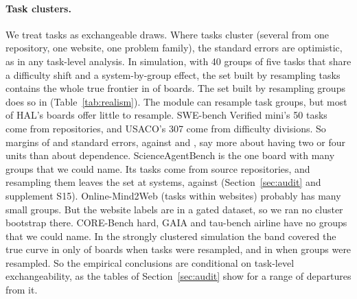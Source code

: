 \documentclass[11pt]{article}
\begin{document}
\paragraph{Task clusters.}
We treat tasks as exchangeable draws. Where tasks cluster (several from one repository, one website, one problem family), the standard errors are optimistic, as in any task-level analysis. In simulation, with 40 groups of five tasks that share a difficulty shift and a system-by-group effect, the set built by resampling tasks contains the whole true frontier in \NumValScClusteredTasksJoint{} of boards. The set built by resampling groups does so in \NumValScClusteredTasksClusterJoint{} (Table~\ref{tab:realism}). The module can resample task groups, but most of HAL's boards offer little to resample. SWE-bench Verified mini's 50 tasks come from \NumClusterSwebenchGroups{} repositories, and USACO's 307 come from \NumClusterUsacoGroups{} difficulty divisions. So margins of \NumClusterSwebenchMarginClusters{} and \NumClusterUsacoMarginClusters{} standard errors, against \NumClusterSwebenchMarginTasks{} and \NumClusterUsacoMarginTasks{}, say more about having two or four units than about dependence. ScienceAgentBench is the one board with many groups that we could name. Its tasks come from \NumClusterSabGroups{} source repositories, and resampling them leaves the set at \NumClusterSabSetClusters{} systems, against \NumClusterSabSetTasks{} (Section~\ref{sec:audit} and supplement S15). Online-Mind2Web (tasks within websites) probably has many small groups. But the website labels are in a gated dataset, so we ran no cluster bootstrap there. CORE-Bench hard, GAIA and tau-bench airline have no groups that we could name. In the strongly clustered simulation the band covered the true curve in only \NumValScStronglyClusteredTasksBand{} of boards when tasks were resampled, and in \NumValScStronglyClusteredTasksBandCluster{} when groups were resampled. So the empirical conclusions are conditional on task-level exchangeability, as the tables of Section~\ref{sec:audit} show for a range of departures from it.
\end{document}
